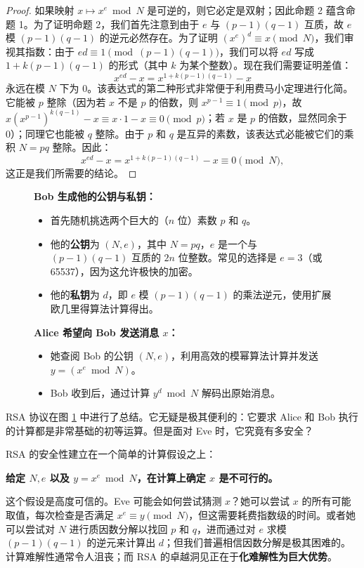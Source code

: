 \begin{proof}
如果映射 $x \mapsto x^e \bmod N$ 是可逆的，则它必定是双射；因此命题 2 蕴含命题 1。为了证明命题 2，我们首先注意到由于 $e$ 与 $(p-1)(q-1)$ 互质，故 $e$ 模 $(p-1)(q-1)$ 的逆元必然存在。为了证明 $(x^e)^d \equiv x \pmod N$，我们审视其指数：由于 $ed \equiv 1 \pmod{(p-1)(q-1)}$，我们可以将 $ed$ 写成 $1 + k(p-1)(q-1)$ 的形式（其中 $k$ 为某个整数）。现在我们需要证明差值：
\[
x^{ed} - x = x^{1 + k(p-1)(q-1)} - x
\]
永远在模 $N$ 下为 0。该表达式的第二种形式非常便于利用费马小定理进行化简。它能被 $p$ 整除（因为若 $x$ 不是 $p$ 的倍数，则 $x^{p-1} \equiv 1 \pmod p$，故 $x(x^{p-1})^{k(q-1)} - x \equiv x \cdot 1 - x \equiv 0 \pmod p$；若 $x$ 是 $p$ 的倍数，显然同余于 0）；同理它也能被 $q$ 整除。由于 $p$ 和 $q$ 是互异的素数，该表达式必能被它们的乘积 $N = pq$ 整除。因此：
\[
x^{ed} - x = x^{1 + k(p-1)(q-1)} - x \equiv 0 \pmod N,
\]
这正是我们所需要的结论。
\end{proof}

\begin{figure}[htbp]
\centering
\begin{tcolorbox}[colback=white,colframe=gray!50!black,title={\textbf{图 1.9}\quad RSA 密码体制流程}]
\textbf{Bob 生成他的公钥与私钥：}
\begin{itemize}
    \item 首先随机挑选两个巨大的（$n$ 位）素数 $p$ 和 $q$。
    \item 他的\textbf{公钥}为 $(N, e)$，其中 $N = pq$，$e$ 是一个与 $(p-1)(q-1)$ 互质的 $2n$ 位整数。常见的选择是 $e = 3$（或 65537），因为这允许极快的加密。
    \item 他的\textbf{私钥}为 $d$，即 $e$ 模 $(p-1)(q-1)$ 的乘法逆元，使用扩展欧几里得算法计算得出。
\end{itemize}
\textbf{Alice 希望向 Bob 发送消息 $x$：}
\begin{itemize}
    \item 她查阅 Bob 的公钥 $(N, e)$，利用高效的模幂算法计算并发送 $y = (x^e \bmod N)$。
    \item Bob 收到后，通过计算 $y^d \bmod N$ 解码出原始消息。
\end{itemize}
\end{tcolorbox}
\label{fig:rsa_protocol}
\end{figure}

RSA 协议在图 \ref{fig:rsa_protocol} 中进行了总结。它无疑是极其便利的：它要求 Alice 和 Bob 执行的计算都是非常基础的初等运算。但是面对 Eve 时，它究竟有多安全？

RSA 的安全性建立在一个简单的计算假设之上：
\begin{center}
    \textbf{给定 $N, e$ 以及 $y = x^e \bmod N$，在计算上确定 $x$ 是不可行的。}
\end{center}
这个假设是高度可信的。Eve 可能会如何尝试猜测 $x$？她可以尝试 $x$ 的所有可能取值，每次检查是否满足 $x^e \equiv y \pmod N$，但这需要耗费指数级的时间。或者她可以尝试对 $N$ 进行质因数分解以找回 $p$ 和 $q$，进而通过对 $e$ 求模 $(p-1)(q-1)$ 的逆元来计算出 $d$；但我们普遍相信因数分解是极其困难的。计算难解性通常令人沮丧；而 RSA 的卓越洞见正在于\textbf{化难解性为巨大优势}。

